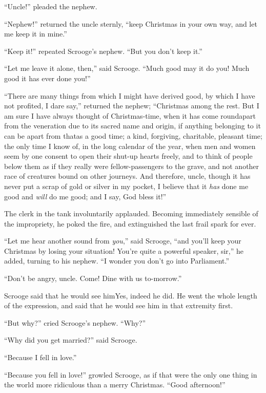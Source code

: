\documentclass[paper=5.5in:8.5in,BCOR=10mm,twoside,DIV=15,12pt,usegeometry,openany]{scrbook} %
\begin{document}
\enquote{Uncle!} pleaded the nephew.

\enquote{Nephew!} returned the uncle sternly, \enquote{keep Christmas in your own way, and let me keep it in mine.}

\enquote{Keep it!} repeated Scrooge's nephew. \enquote{But you don't keep it.}

\enquote{Let me leave it alone, then,} said Scrooge. \enquote{Much good may it do you! Much good it has ever done you!}

\enquote{There are many things from which I might have derived good, by which I have not profited, I dare say,} returned the nephew; \enquote{Christmas among the rest. But I am sure I have always thought of Christmas-time, when it has come round\textemdash apart from the veneration due to its sacred name and origin, if anything belonging to it can be apart from that\textemdash as a good time; a kind, forgiving, charitable, pleasant time; the only time I know of, in the long calendar of the year, when men and women seem by one consent to open their shut-up hearts freely, and to think of people below them as if they really were fellow-passengers to the grave, and not another race of creatures bound on other journeys. And therefore, uncle, though it has never put a scrap of gold or silver in my pocket, I believe that it \textit{has} done me good and \textit{will} do me good; and I say, God bless it!}

The clerk in the tank involuntarily applauded. Becoming immediately sensible of the impropriety, he poked the fire, and extinguished the last frail spark for ever.

\enquote{Let me hear another sound from \textit{you},} said Scrooge, \enquote{and you'll keep your Christmas by losing your situation! You're quite a powerful speaker, sir,} he added, turning to his nephew. \enquote{I wonder you don't go into Parliament.}

\enquote{Don't be angry, uncle. Come! Dine with us to-morrow.}

Scrooge said that he would see him\textemdash \textemdash Yes, indeed he did. He went the whole length of the expression, and said that he would see him in that extremity first.

\enquote{But why?} cried Scrooge's nephew. \enquote{Why?}

\enquote{Why did you get married?} said Scrooge.

\enquote{Because I fell in love.}

\enquote{Because you fell in love!} growled Scrooge, as if that were the only one thing in the world more ridiculous than a merry Christmas. \enquote{Good afternoon!}
\end{document}
